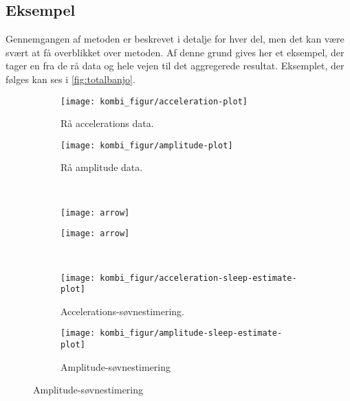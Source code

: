 \subsection{Eksempel}
Gennemgangen af metoden er beskrevet i detalje for hver del, men det kan være svært at få overblikket over metoden.
Af denne grund gives her et eksempel, der tager en fra de rå data og hele vejen til det aggregerede resultat.
Eksemplet, der følges kan ses i \cref{fig:totalbanjo}.
\begin{figure}
	\begin{minipage}{\linewidth}
		\begin{subfigure}{0.5\linewidth}
			\centering
			\texttt{[image: kombi\_figur/acceleration-plot]}
			\caption{Rå accelerations data.}\label{fig:rawaccplot}
		\end{subfigure}
		\begin{subfigure}{0.5\linewidth}
			\centering
			\texttt{[image: kombi\_figur/amplitude-plot]}
			\caption{Rå amplitude data.}\label{fig:rawamplplot}
		\end{subfigure}
	\end{minipage}\\[1ex]%
	\begin{minipage}{\linewidth}
		\begin{subfigure}{0.5\linewidth}
			\centering
			\texttt{[image: arrow]}
		\end{subfigure}
		\begin{subfigure}{0.5\linewidth}
			\centering
			\texttt{[image: arrow]}
		\end{subfigure}
	\end{minipage}\\[1ex]%
	\begin{minipage}{\linewidth}
		\begin{subfigure}{0.5\linewidth}
			\centering
			\texttt{[image: kombi\_figur/acceleration-sleep-estimate-plot]}
			\caption{Accelerations-søvnestimering.}\label{fig:sleepcalcaccplot}
		\end{subfigure}
		\begin{subfigure}{0.5\linewidth}
			\centering
			\texttt{[image: kombi\_figur/amplitude-sleep-estimate-plot]}
			\caption{Amplitude-søvnestimering}\label{fig:sleepcalcamplplot}

\end{subfigure}
\end{minipage}
\end{figure}
